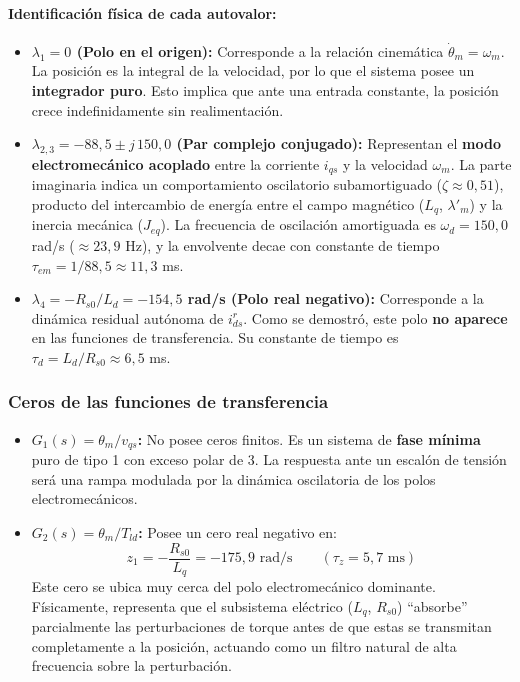 \documentclass[12pt, a4paper,journal, onecolumn, compsoc]{IEEEtran}
\begin{document}
\paragraph{Identificación física de cada autovalor:} \mbox{}

\begin{itemize}
    \item \textbf{$\lambda_1 = 0$ (Polo en el origen):} Corresponde a la relación cinemática $\dot{\theta}_m = \omega_m$. La posición es la integral de la velocidad, por lo que el sistema posee un \textbf{integrador puro}. Esto implica que ante una entrada constante, la posición crece indefinidamente sin realimentación.

    \item \textbf{$\lambda_{2,3} = -88{,}5 \pm j\,150{,}0$ (Par complejo conjugado):} Representan el \textbf{modo electromecánico acoplado} entre la corriente $i_{qs}$ y la velocidad $\omega_m$. La parte imaginaria indica un comportamiento oscilatorio subamortiguado ($\zeta \approx 0{,}51$), producto del intercambio de energía entre el campo magnético ($L_q$, $\lambda'_m$) y la inercia mecánica ($J_{eq}$). La frecuencia de oscilación amortiguada es $\omega_d = 150{,}0$ rad/s ($\approx 23{,}9$ Hz), y la envolvente decae con constante de tiempo $\tau_{em} = 1/88{,}5 \approx 11{,}3$ ms.

    \item \textbf{$\lambda_4 = -R_{s0}/L_d = -154{,}5$ rad/s (Polo real negativo):} Corresponde a la dinámica residual autónoma de $i_{ds}^r$. Como se demostró, este polo \textbf{no aparece} en las funciones de transferencia. Su constante de tiempo es $\tau_d = L_d/R_{s0} \approx 6{,}5$ ms.
\end{itemize}

\subsubsection{Ceros de las funciones de transferencia}

\begin{itemize}
    \item \textbf{$G_1(s) = \theta_m / v_{qs}$:} No posee ceros finitos. Es un sistema de \textbf{fase mínima} puro de tipo 1 con exceso polar de 3. La respuesta ante un escalón de tensión será una rampa modulada por la dinámica oscilatoria de los polos electromecánicos.

    \item \textbf{$G_2(s) = \theta_m / T_{ld}$:} Posee un cero real negativo en:
    \begin{equation}
        z_1 = -\frac{R_{s0}}{L_q} = -175{,}9 \text{ rad/s} \qquad (\tau_z = 5{,}7 \text{ ms})
    \end{equation}
    Este cero se ubica muy cerca del polo electromecánico dominante. Físicamente, representa que el subsistema eléctrico ($L_q$, $R_{s0}$) ``absorbe'' parcialmente las perturbaciones de torque antes de que estas se transmitan completamente a la posición, actuando como un filtro natural de alta frecuencia sobre la perturbación.
\end{itemize}
\end{document}
